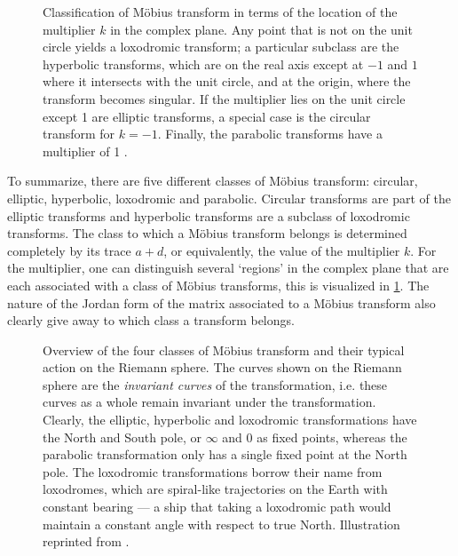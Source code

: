 
\begin{figure}
    \centering
     
    \caption{Classification of Möbius transform in terms of the location of the multiplier \(k\) in the complex plane. Any point that is not on the unit circle yields a loxodromic transform; a particular subclass are the hyperbolic transforms, which are on the real axis except at \(-1\) and \(1\) where it intersects with the unit circle, and at the origin, where the transform becomes singular. If the multiplier lies on the unit circle except 1 are elliptic transforms, a special case is the circular transform for \(k = -1\). Finally, the parabolic transforms have a multiplier of 1 \cite{Needham1997}.}
    \label{fig:multiplier_regions}
\end{figure}
To summarize, there are five different classes of Möbius transform: circular, elliptic, hyperbolic, loxodromic and parabolic. Circular transforms are part of the elliptic transforms and hyperbolic transforms are a subclass of loxodromic transforms. The class to which a Möbius transform belongs is determined completely by its trace \(a + d\), or equivalently, the value of the multiplier \(k\). For the multiplier, one can distinguish several `regions' in the complex plane that are each associated with a class of Möbius transforms, this is visualized in \cref{fig:multiplier_regions}. The nature of the Jordan form of the matrix associated to a Möbius transform also clearly give away to which class a transform belongs. 
\begin{figure}
    \centering
    
    \caption{Overview of the four classes of Möbius transform and their typical action on the Riemann sphere. The curves shown on the Riemann sphere are the \emph{invariant curves} of the transformation, i.e. these curves as a whole remain invariant under the transformation. Clearly, the elliptic, hyperbolic and loxodromic transformations have the North and South pole, or \(\infty\) and 0 as fixed points, whereas the parabolic transformation only has a single fixed point at the North pole. The loxodromic transformations borrow their name from loxodromes, which are spiral-like trajectories on the Earth with constant bearing --- a ship that taking a loxodromic path would maintain a constant angle with respect to true North. Illustration reprinted from \citet[p. 78]{Needham2021}.}
    \label{fig:riemann_transforms}
\end{figure}

